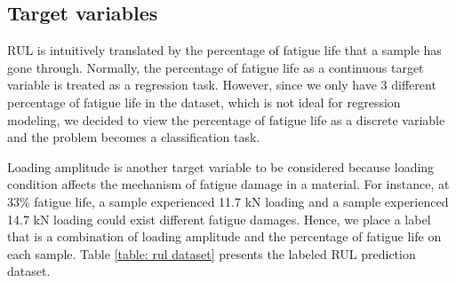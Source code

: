\subsection{Target variables}
RUL is intuitively translated by the percentage of fatigue life that a sample has gone through. Normally, the percentage of fatigue life as a continuous target variable is treated as a regression task. However, since we only have 3 different percentage of fatigue life in the dataset, which is not ideal for regression modeling, we decided to view the percentage of fatigue life as a discrete variable and the problem becomes a classification task.

Loading amplitude is another target variable to be considered because loading condition affects the mechanism of fatigue damage in a material. For instance, at 33\% fatigue life, a sample experienced 11.7 kN loading and a sample experienced 14.7 kN loading could exist different fatigue damages. Hence, we place a label that is a combination of loading amplitude and the percentage of fatigue life on each sample. Table \ref{table: rul dataset} presents the labeled RUL prediction dataset.

